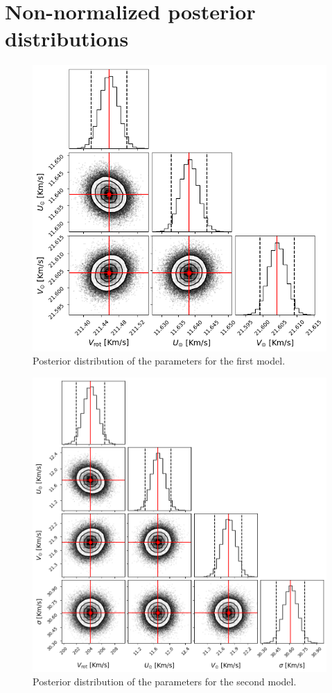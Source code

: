 \newpage
\appendix

\section{Non-normalized posterior distributions}\label{Appendix:PosteriorDistributions}

\begin{figure}[h]
    \centering
    \includegraphics[width = 0.8\linewidth]{Fig/PosteriorSimple.png}
    \caption{Posterior distribution of the parameters for the first model.}\label{fig:PosteriorSimple}
\end{figure}

\begin{figure}[h]
    \centering
    \includegraphics[width = 0.8\linewidth]{Fig/PosteriorFull.png}
    \caption{Posterior distribution of the parameters for the second model.}\label{fig:PosteriorFull}
\end{figure}